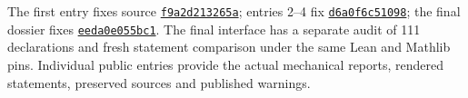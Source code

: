 The first entry fixes source \href{https://github.com/Vulkin-prog/paper-p1-lean/tree/f9a2d213265a6833318745dd7f2d74c02090ab19}{\texttt{f9a2d213265a}}; entries 2--4 fix \href{https://github.com/Vulkin-prog/paper-p1-lean/tree/d6a0f6c5109886127526677603eb6b74e8c0cd82}{\texttt{d6a0f6c51098}}; the final dossier fixes \href{https://github.com/Vulkin-prog/paper-p1-lean/tree/eeda0e055bc16afa6bb6402727afe733ace9961e}{\texttt{eeda0e055bc1}}.
The final interface has a separate audit of 111 declarations and fresh statement comparison under the same Lean and Mathlib pins. Individual public entries provide the actual mechanical reports, rendered statements, preserved sources and published warnings.

